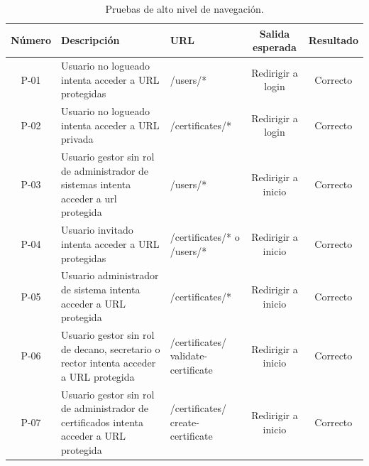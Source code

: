 \begin{table}[!h]
	\begin{center}
		\begin{tabular}{|c|p{3cm}|p{3cm}|c|c|}
		\hline \textbf{Número} & \textbf{Descripción} & \textbf{URL} & \textbf{Salida esperada} & \textbf{Resultado}\\ 
		\hline P-01 & Usuario no logueado intenta acceder a URL protegidas & /users/* & Redirigir a login & Correcto\\
		\hline P-02 & Usuario no logueado intenta acceder a URL privada & /certificates/* & Redirigir a login & Correcto\\
		\hline P-03 & Usuario gestor sin rol de administrador de sistemas intenta acceder a url protegida & /users/* & Redirigir a inicio & Correcto\\
		\hline P-04 & Usuario invitado intenta acceder a URL protegidas & /certificates/* o /users/* & Redirigir a inicio & Correcto\\
		\hline P-05 & Usuario administrador de sistema intenta acceder a URL protegida & /certificates/* & Redirigir a inicio & Correcto\\
		\hline P-06 & Usuario gestor sin rol de decano, secretario o rector intenta acceder a URL protegida & /certificates/   validate-certificate & Redirigir a inicio & Correcto\\
		\hline P-07 & Usuario gestor sin rol de administrador de certificados intenta acceder a URL protegida & /certificates/   create-certificate & Redirigir a inicio & Correcto\\
		\hline 
		\end{tabular}
		\caption{Pruebas de alto nivel de navegación.}
		\label{tab:navTest}
	\end{center}
\end{table}

